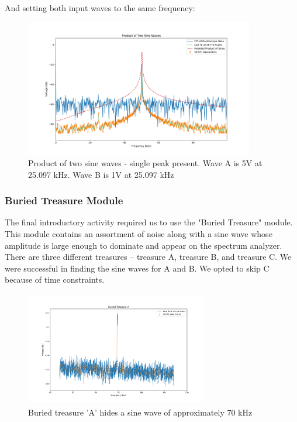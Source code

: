 \documentclass{article}
\begin{document}
And setting both input waves to the same frequency:

\begin{figure}[H]
    \centering
\begin{minipage}{11cm}
\begin{tcolorbox}
    \centering
        \includegraphics[width=10cm, height=6cm]{figures/figure15.png}
        \caption{Product of two sine waves - single peak present. Wave A is 5V
        at 25.097 kHz. Wave B is 1V at 25.097 kHz}
        \label{fig:fig15}
\end{tcolorbox}
\end{minipage}
\end{figure}


\pagebreak
\subsubsection{Buried Treasure Module}%
\label{sub:buried_treasure_module}

The final introductory activity required us to use the "Buried Treasure"
module. This module contains an assortment of noise along with a sine wave
whose amplitude is large enough to dominate and appear on the spectrum
analyzer. There are three different treasures -- treasure A, treasure B, and
treasure C. We were successful in finding the sine waves for A and B. We opted
to skip C because of time constraints. 

\begin{figure}[H]
    \centering
\begin{minipage}{11cm}
\begin{tcolorbox}
    \centering
        \includegraphics[width=8cm, height=5cm]{figures/figure16.png}
        \caption{Buried treasure 'A' hides a sine wave of approximately 70 kHz}
        \label{fig:fig16}
\end{tcolorbox}
\end{minipage}
\end{figure}
\end{document}
